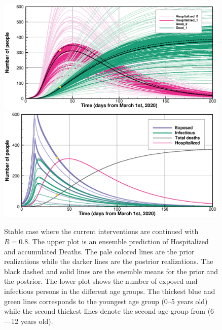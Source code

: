 \documentclass[twoside,11pt]{article}
\begin{document}
\begin{figure}[p]
\begin{center}
\includegraphics[width=0.99\textwidth]{closedA08.eps}\\ 
\includegraphics[width=0.99\textwidth]{closedB08.eps}
\end{center}
\caption{Stable case  where the current interventions are continued with $R=0.8$. 
The upper plot is  an ensemble prediction of Hospitalized and accumulated Deaths.
The pale colored
lines are the prior realizations while the darker lines are the postrior realizations. The black dashed and solid lines are the
enemble means for the prior and the postrior.  The lower plot shows the number of exposed and infectious persons in the different 
age groups.  The thickest blue and green lines corresponds to the youngest age group (0--5 years old) while the second
thickest lines denote the second age group from (6---12 years old).
\label{fig:closed08}}
\end{figure}
\end{document}
